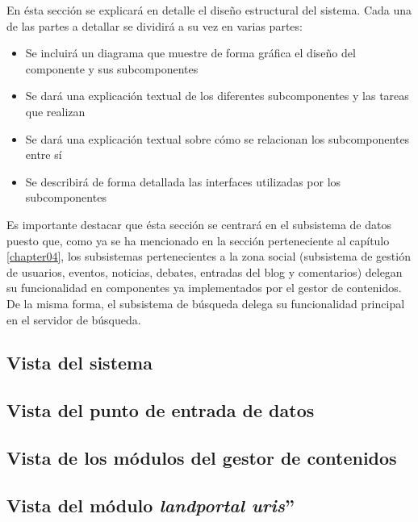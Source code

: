 En ésta sección se explicará en detalle el diseño estructural del sistema.  Cada una de las partes a detallar se dividirá a su vez en varias partes:
\begin{itemize}
	\item Se incluirá un diagrama que muestre de forma gráfica el diseño del componente y sus subcomponentes
	\item Se dará una explicación textual de los diferentes subcomponentes y las tareas que realizan
	\item Se dará una explicación textual sobre cómo se relacionan los subcomponentes entre sí
	\item Se describirá de forma detallada las interfaces utilizadas por los subcomponentes
\end{itemize}

Es importante destacar que ésta sección se centrará en el subsistema de datos puesto que, como ya se ha mencionado en la sección  perteneciente al capítulo \ref{chapter04}, los subsistemas pertenecientes a la zona social (subsistema de gestión de usuarios, eventos, noticias, debates, entradas del blog y comentarios) delegan su funcionalidad en componentes ya implementados por el gestor de contenidos.  De la misma forma, el subsistema de búsqueda delega su funcionalidad principal en el servidor de búsqueda.

\subsection{Vista del sistema}
\label{vista_sistema}



\subsection{Vista del punto de entrada de datos}
\label{vista_receiver}

\subsection{Vista de los módulos del gestor de contenidos}
\label{vista_modulos_cms}

\subsection{Vista del módulo \textit{landportal uris}''}
\label{vista_landportal_uris}
